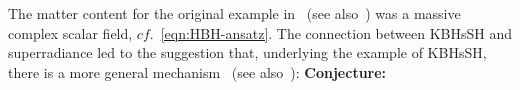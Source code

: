 %
%
%
The matter content for the original example in~\cite{Herdeiro:2014goa} (see also~\cite{Herdeiro:2015gia}) was a massive complex scalar field, $cf.$~\eqref{eqn:HBH-ansatz}.
The connection between KBHsSH and superradiance led to the suggestion that, underlying the example of KBHsSH, there is a more general mechanism~\cite{Herdeiro:2014goa,Herdeiro:2014ima} (see also~\cite{Herdeiro:2015waa,Herdeiro:2015gia}): 
{\bf Conjecture:}
